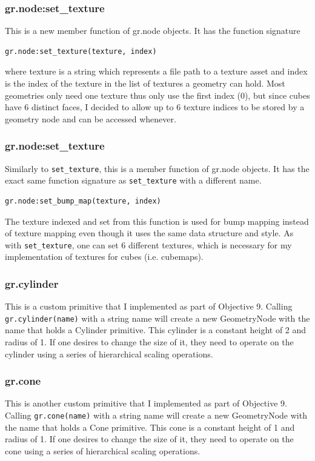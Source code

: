 \documentclass {article}
\begin{document}
\subsubsection{gr.node:set\_texture}
This is a new member function of gr.node objects. It has the function signature
\begin{verbatim}
gr.node:set_texture(texture, index)
\end{verbatim}
where texture is a string which represents a file path to a texture asset and index is the index of the texture in the
list of textures a geometry can hold. Most geometries only need one texture thus only use the
first index (0), but since cubes have 6 distinct faces, I decided to allow up to 6 texture indices
to be stored by a geometry node and can be accessed whenever.
\subsubsection{gr.node:set\_texture}
Similarly to \texttt{set\_texture}, this is a member function of gr.node objects. It has
the exact same function signature as \texttt{set\_texture} with a different name.
\begin{verbatim}
gr.node:set_bump_map(texture, index)
\end{verbatim}
The texture indexed and set from this function is used for bump mapping instead of texture mapping
even though it uses the same data structure and style. As with \texttt{set\_texture}, one can set
6 different textures, which is necessary for my implementation of textures for cubes (i.e. cubemaps).
\subsubsection{gr.cylinder}
This is a custom primitive that I implemented as part of Objective 9. Calling \texttt{gr.cylinder(name)} 
with a string name will create a new GeometryNode with the name that holds a Cylinder primitive. This cylinder
is a constant height of 2 and radius of 1. If one desires to change the size of it, they need to operate on the cylinder
using a series of hierarchical scaling operations.
\subsubsection{gr.cone}
This is another custom primitive that I implemented as part of Objective 9. Calling \texttt{gr.cone(name)} 
with a string name will create a new GeometryNode with the name that holds a Cone primitive. This cone
is a constant height of 1 and radius of 1. If one desires to change the size of it, they need to operate on the cone
using a series of hierarchical scaling operations.
\end{document}
